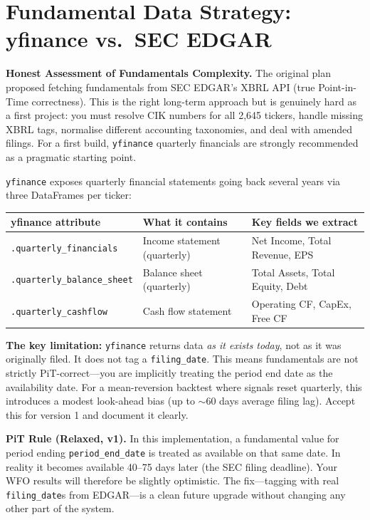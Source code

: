 \documentclass[11pt, oneside]{book}
\begin{document}
\section{Fundamental Data Strategy: yfinance vs.\ SEC EDGAR}

\begin{warningbox}
\textbf{Honest Assessment of Fundamentals Complexity.} The original plan proposed fetching fundamentals from SEC EDGAR's XBRL API (true Point-in-Time correctness). This is the right long-term approach but is genuinely hard as a first project: you must resolve CIK numbers for all 2,645 tickers, handle missing XBRL tags, normalise different accounting taxonomies, and deal with amended filings. For a first build, \texttt{yfinance} quarterly financials are strongly recommended as a pragmatic starting point.
\end{warningbox}

\texttt{yfinance} exposes quarterly financial statements going back several years via three DataFrames per ticker:

\begin{center}
\begin{tabular}{lll}
\toprule
\textbf{yfinance attribute} & \textbf{What it contains} & \textbf{Key fields we extract} \\
\midrule
\texttt{.quarterly\_financials}    & Income statement (quarterly) & Net Income, Total Revenue, EPS \\
\texttt{.quarterly\_balance\_sheet} & Balance sheet (quarterly)    & Total Assets, Total Equity, Debt \\
\texttt{.quarterly\_cashflow}       & Cash flow statement          & Operating CF, CapEx, Free CF \\
\bottomrule
\end{tabular}
\end{center}

\textbf{The key limitation:} \texttt{yfinance} returns data \textit{as it exists today}, not as it was originally filed. It does not tag a \texttt{filing\_date}. This means fundamentals are not strictly PiT-correct---you are implicitly treating the period end date as the availability date. For a mean-reversion backtest where signals reset quarterly, this introduces a modest look-ahead bias (up to $\sim$60 days average filing lag). Accept this for version 1 and document it clearly.

\begin{institutionbox}
\textbf{PiT Rule (Relaxed, v1).} In this implementation, a fundamental value for period ending \texttt{period\_end\_date} is treated as available on that same date. In reality it becomes available 40--75 days later (the SEC filing deadline). Your WFO results will therefore be slightly optimistic. The fix---tagging with real \texttt{filing\_date}s from EDGAR---is a clean future upgrade without changing any other part of the system.
\end{institutionbox}
\end{document}
